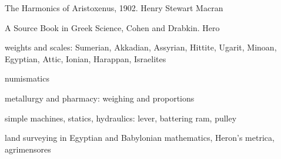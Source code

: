 The Harmonics of Aristoxenus, 1902. Henry Stewart Macran

A Source Book in Greek Science, Cohen and Drabkin. Hero

weights and scales: Sumerian, Akkadian, Assyrian, Hittite, Ugarit, Minoan, Egyptian, Attic, Ionian, Harappan, Israelites

numismatics

metallurgy and pharmacy: weighing and proportions

simple machines, statics, hydraulics: lever, battering ram, pulley

land surveying in Egyptian and Babylonian mathematics, Heron's metrica, agrimensores